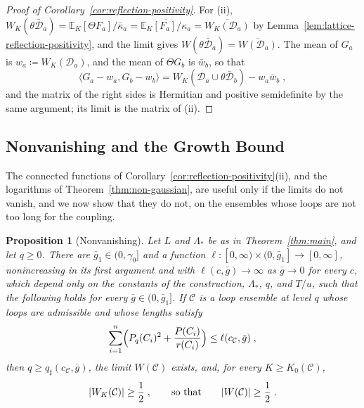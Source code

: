 \documentclass[11pt]{preprint}
\DeclarePairedDelimiter{\abs}{\lvert}{\rvert}
\numberwithin{equation}{section}
\newtheorem{proposition}[theorem]{Proposition}
\theoremstyle{definition}
\theoremstyle{remark}
\theoremstyle{plain}
\begin{document}
\begin{proof}[Proof of Corollary~\ref{cor:reflection-positivity}]
For (ii), $W_K(\theta\bar{\mathcal D}_a) = \mathbb E_K[\Theta F_a]/\bar\kappa_a = \overline{\mathbb E_K[F_a]/\kappa_a} = \overline{W_K(\mathcal D_a)}$ by Lemma~\ref{lem:lattice-reflection-positivity}, and the limit gives $W(\theta\bar{\mathcal D}_a) = \overline{W(\mathcal D_a)}$. The mean of $G_a$ is $w_a \coloneqq W_K(\mathcal D_a)$, and the mean of $\Theta G_b$ is $\bar w_b$, so that
\begin{equation}\label{eq:connected-gram}
    \langle G_a - w_a, G_b - w_b\rangle = W_K(\mathcal D_a \cup \theta\bar{\mathcal D}_b) - w_a\bar w_b\;,
\end{equation}
and the matrix of the right sides is Hermitian and positive semidefinite by the same argument; its limit is the matrix of (ii).
\end{proof}

\subsection{Nonvanishing and the Growth Bound}\label{sec:nonvanishing}

The connected functions of Corollary~\ref{cor:reflection-positivity}(ii), and the logarithms of Theorem~\ref{thm:non-gaussian}, are useful only if the limits do not vanish, and we now show that they do not, on the ensembles whose loops are not too long for the coupling.

\begin{proposition}[Nonvanishing]\label{prop:nonvanishing}
Let $L$ and $\Lambda_*$ be as in Theorem~\ref{thm:main}, and let $q \geq 0$. There are $\bar g_1 \in (0, \gamma_0]$ and a function $\ell \colon [0, \infty) \times (0, \bar g_1] \to [0, \infty]$, nonincreasing in its first argument and with $\ell(c, \bar g) \to \infty$ as $\bar g \to 0$ for every $c$, which depend only on the constants of the construction, $\Lambda_*$, $q$, and $T/u$, such that the following holds for every $\bar g \in (0, \bar g_1]$. If $\mathcal C$ is a loop ensemble at level $q$ whose loops are admissible and whose lengths satisfy
\begin{equation}\label{eq:nonvanishing-length}
    \sum_{i=1}^{n}\Bigl(P_q(C_i)^2 + \frac{P(C_i)}{r(C_i)}\Bigr) \leq \ell(c_{\mathcal C}, \bar g)\;,
\end{equation}
then $q \geq q_\sharp(c_{\mathcal C}, \bar g)$, the limit $W(\mathcal C)$ exists, and, for every $K \geq K_0(\mathcal C)$,
\begin{equation}\label{eq:nonvanishing-bound}
    \abs{W_K(\mathcal C)} \geq \frac12\;,
    \qquad\text{so that}\qquad
    \abs{W(\mathcal C)} \geq \frac12\;.
\end{equation}
\end{proposition}
\end{document}
